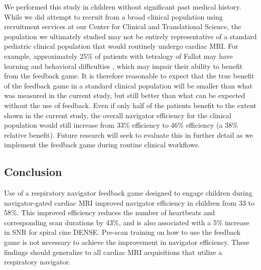 		We performed this study in children without significant past medical history. While we did attempt to recruit from a broad clinical population using recruitment services at our Center for Clinical and Translational Science, the population we ultimately studied may not be entirely representative of a standard pediatric clinical population that would routinely undergo cardiac MRI. For example, approximately 25\% of patients with tetralogy of Fallot may have learning and behavioral difficulties \cite{Piran2011}, which may impair their ability to benefit from the feedback game. It is therefore reasonable to expect that the true benefit of the feedback game in a standard clinical population will be smaller than what was measured in the current study, but still better than what can be expected without the use of feedback. Even if only half of the patients benefit to the extent shown in the current study, the overall navigator efficiency for the clinical population would still increase from 33\% efficiency to 46\% efficiency (a 38\% relative benefit). Future research will seek to evaluate this in further detail as we implement the feedback game during routine clinical workflows.
		
	\subsection{Conclusion}
		Use of a respiratory navigator feedback game designed to engage children during navigator-gated cardiac MRI improved navigator efficiency in children from 33 to 58\%. This improved efficiency reduces the number of heartbeats and corresponding scan durations by 43\%, and is also associated with a 5\% increase in SNR for spiral cine DENSE. Pre-scan training on how to use the feedback game is not necessary to achieve the improvement in navigator efficiency. These findings should generalize to all cardiac MRI acquisitions that utilize a respiratory navigator.